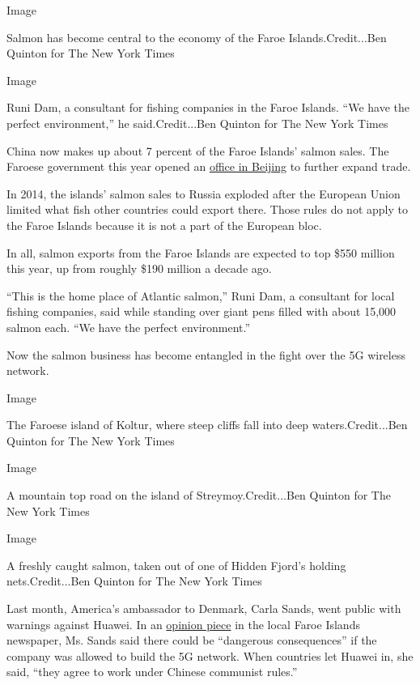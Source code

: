 Image

Salmon has become central to the economy of the Faroe
Islands.Credit...Ben Quinton for The New York Times

Image

Runi Dam, a consultant for fishing companies in the Faroe Islands. ``We
have the perfect environment,'' he said.Credit...Ben Quinton for The New
York Times

China now makes up about 7 percent of the Faroe Islands' salmon sales.
The Faroese government this year opened an
\href{https://www.faroeislands.fo/the-big-picture/news/faroese-representation-to-open-in-beijing/}{office
in Beijing} to further expand trade.

In 2014, the islands' salmon sales to Russia exploded after the European
Union limited what fish other countries could export there. Those rules
do not apply to the Faroe Islands because it is not a part of the
European bloc.

In all, salmon exports from the Faroe Islands are expected to top \$550
million this year, up from roughly \$190 million a decade ago.

``This is the home place of Atlantic salmon,'' Runi Dam, a consultant
for local fishing companies, said while standing over giant pens filled
with about 15,000 salmon each. ``We have the perfect environment.''

Now the salmon business has become entangled in the fight over the 5G
wireless network.

Image

The Faroese island of Koltur, where steep cliffs fall into deep
waters.Credit...Ben Quinton for The New York Times

Image

A mountain top road on the island of Streymoy.Credit...Ben Quinton for
The New York Times

Image

A freshly caught salmon, taken out of one of Hidden Fjord's holding
nets.Credit...Ben Quinton for The New York Times

Last month, America's ambassador to Denmark, Carla Sands, went public
with warnings against Huawei. In an
\href{https://www.tidende.dk/tidende/indland/2019/11/29/usa-skraemmer-faeroeerne-fra-at-koebe-5g-kinesiske-huawei/}{opinion
piece} in the local Faroe Islands newspaper, Ms. Sands said there could
be ``dangerous consequences'' if the company was allowed to build the 5G
network. When countries let Huawei in, she said, ``they agree to work
under Chinese communist rules.''

